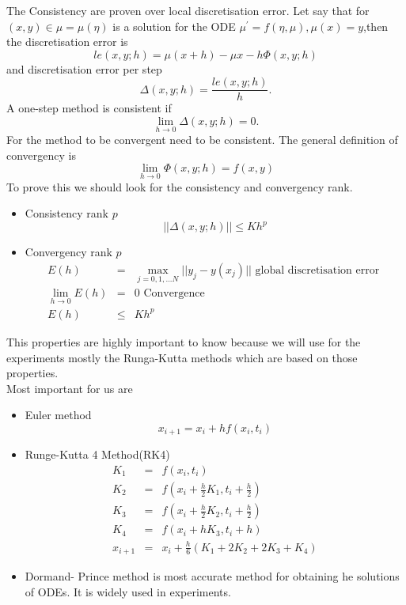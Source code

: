 The Consistency are proven over local discretisation error.
Let say that for $(x,y)\in  \mu = \mu(\eta)$ is a solution for the ODE $\mu^{'} = f(\eta,\mu), \mu(x)=y$,then the discretisation error is
\begin{equation}
	le(x,y;h) = \mu(x+h)-\mu{x}-h\Phi(x,y;h)
\end{equation}
and discretisation error per step
\begin{equation}
	\Delta(x,y;h)=\frac{le(x,y;h)}{h}. 
\end{equation}
A one-step method is consistent if
\begin{equation}
	\lim_{h\rightarrow 0} \Delta(x,y;h) = 0.
\end{equation}
For the method to be convergent need to be consistent. The general definition of convergency is
\begin{equation}
\lim_{h\rightarrow 0} \Phi(x,y;h) = f(x,y)
\end{equation}
To prove this we should look for the consistency and convergency rank.
\begin{itemize}
	\item Consistency rank $p$\begin{equation}
		||\Delta(x,y;h)||\leq Kh^p
	\end{equation}
\item Convergency rank $p$
\begin{eqnarray}
	E(h) &=& \max_{j=0,1,...N}||y_j-y(x_j)||\text{ global discretisation error }\\
	\lim_{h\rightarrow 0}E(h) &=& 0 \text{ Convergence}\\
	E(h) &\leq&  Kh^p
\end{eqnarray}



\end{itemize} 
This properties are highly important to know because we will use for the experiments mostly the Runga-Kutta methods which are based on those properties.\\
Most important for us are
\begin{itemize}
	\item Euler method
		\begin{equation}
			x_{i+1} = x_i + hf(x_i,t_i)
		\end{equation}
	\item Runge-Kutta 4 Method(RK4)
		\begin{eqnarray}
			K_1 &=& f(x_i,t_i)\\
			K_2 &=& f(x_i + \frac{h}{2}K_1,t_i +\frac{h}{2})\\
			K_3 &=& f(x_i + \frac{h}{2}K_2,t_i+\frac{h}{2})\\
			K_4 &=& f(x_i + hK_3,t_i +h)\\
			x_{i+1} &=& x_i + \frac{h}{6}(K_1 + 2K_2 +2K_3 +K_4)
		\end{eqnarray}	
	\item Dormand- Prince method is most accurate method for obtaining he solutions of ODEs\cite{dopri5}.
	It is widely used in experiments.\\
		
\end{itemize}
